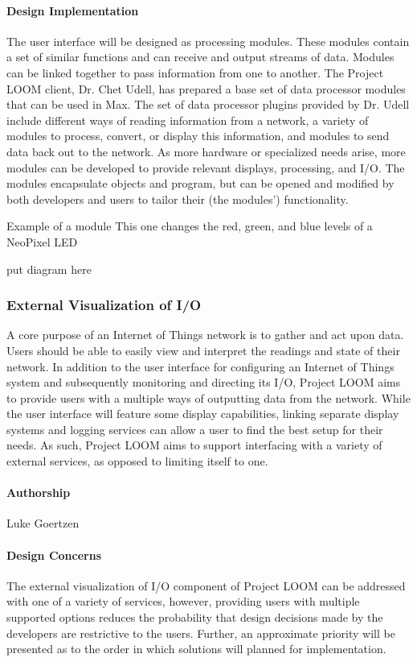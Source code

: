 \documentclass[onecolumn, draftclsnofoot,10pt, compsoc]{IEEEtran}
\begin{document}
\paragraph{Design Implementation}
    The user interface will be designed as processing modules. These modules contain a set of similar functions and can receive and output streams of data. Modules can be linked together to pass information from one to another. The Project LOOM client, Dr. Chet Udell, has prepared a base set of data processor modules that can be used in Max. The set of data processor plugins provided by Dr. Udell include different ways of reading information from a network, a variety of modules to process, convert, or display this information, and modules to send data back out to the network. As more hardware or specialized needs arise, more modules can be developed to provide relevant displays, processing, and I/O. The modules encapsulate objects and program, but can be opened and modified by both developers and users to tailor their (the modules') functionality.

    Example of a module
    This one changes the red, green, and blue levels of a NeoPixel LED

    put diagram here\\



\subsubsection{External Visualization of I/O}
    A core purpose of an Internet of Things network is to gather and act upon data. Users should be able to easily view and interpret the readings and state of their network. In addition to the user interface for configuring an Internet of Things system and subsequently monitoring and directing its I/O, Project LOOM aims to provide users with a multiple ways of outputting data from the network. While the user interface will feature some display capabilities, linking separate display systems and logging services can allow a user to find the best setup for their needs. As such, Project LOOM aims to support interfacing with a variety of external services, as opposed to limiting itself to one.

\paragraph{Authorship}
    Luke Goertzen

\paragraph{Design Concerns}
    The external visualization of I/O component of Project LOOM can be addressed with one of a variety of services, however, providing users with multiple supported options reduces the probability that design decisions made by the developers are restrictive to the users. Further, an approximate priority will be presented as to the order in which solutions will planned for implementation.
\end{document}
